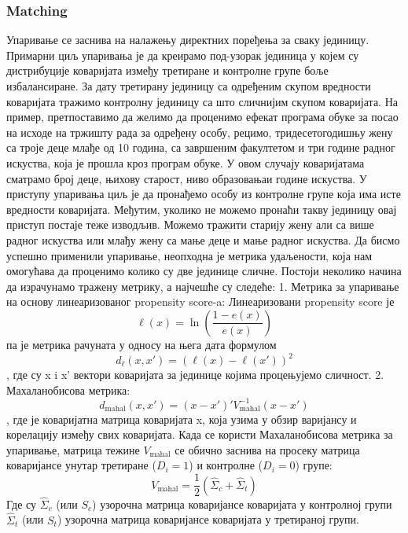 \documentclass[12pt, a4paper]{article}
\begin{document}
\subsubsection{Matching}
Упаривање се заснива на налажењу директних поређења за сваку јединицу.  Примарни циљ упаривања је да креирамо под-узорак јединица у којем су дистрибуције коваријата између третиране и контролне групе боље избалансиране. За дату третирану јединицу са одређеним скупом вредности коваријата тражимо контролну јединицу са што сличнијим скупом коваријата. На пример, претпоставимо да желимо да проценимо ефекат програма обуке за посао на исходе на тржишту рада за одређену особу, рецимо, тридесетогодишњу жену са троје деце млађе од 10 година, са завршеним факултетом и три године радног искуства, која је прошла кроз програм обуке. У овом случају коваријатама сматрамо број деце, њихову старост, ниво образовањаи године искуства. У приступу упаривања циљ је да пронађемо особу из контролне групе која има исте вредности коваријата. Међутим, уколико не можемо пронаћи такву јединицу овај приступ постаје теже изводљив. Можемо тражити старију жену али са више радног искуства или млађу жену са мање деце и мање радног искуства.
Да бисмо успешно применили упаривање, неопходна је метрика удаљености, која нам омогућава да проценимо колико су две јединице сличне. Постоји неколико начина да израчунамо тражену метрику, а најчешће су следеће:
1. Метрика за упаривање на основу линеаризованог propensity score-a:
Линеаризовани  propensity score је $$\ell(x) = \ln\left(\frac{1 - e(x)}{e(x)}\right)$$ па је метрика рачуната у односу на њега дата формулом $$d_\ell(x, x') = (\ell(x) - \ell(x'))^2$$, где су x i x' вектори коваријата за јединице којима процењујемо сличност.
2. Махаланобисова метрика:
$$d_{\text{mahal}}(x, x') = (x - x')' V_{\text{mahal}}^{-1} (x - x')$$, где је {} коваријатна матрица коваријата x, која узима у обзир варијансу и корелацију између свих коваријата. Када се користи Махаланобисова метрика за упаривање, матрица тежине $V_{\text{mahal}}$ се обично заснива на просеку матрица коваријансе унутар третиране ($D_i=1$) и контролне ($D_i=0$) групе:
\[
V_{\text{mahal}} = \frac{1}{2} \left( \hat{\Sigma}_c + \hat{\Sigma}_t \right)
\]
Где су  $\hat{\Sigma}_c$ (или $S_c$) узорочна матрица коваријансе коваријата у контролној групи  $\hat{\Sigma}_t$ (или $S_t$) узорочна матрица коваријансе коваријата у третираној групи.
\end{document}
